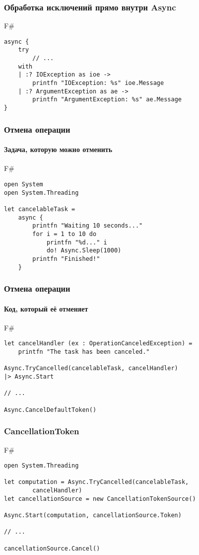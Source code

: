 \documentclass[xetex,mathserif,serif]{beamer}
\begin{document}
	\begin{frame}[fragile]
		\frametitle{Обработка исключений прямо внутри Async}
		\begin{exampleblock}{F\#}
			\begin{verbatim}
async {
    try
        // ...
    with
    | :? IOException as ioe ->
        printfn "IOException: %s" ioe.Message
    | :? ArgumentException as ae ->
        printfn "ArgumentException: %s" ae.Message
}
			\end{verbatim}
		\end{exampleblock}
\end{frame}

	\begin{frame}[fragile]
		\frametitle{Отмена операции}
		\framesubtitle{Задача, которую можно отменить}
		\begin{exampleblock}{F\#}
			\begin{verbatim}
open System
open System.Threading

let cancelableTask =
    async {
        printfn "Waiting 10 seconds..."
        for i = 1 to 10 do
            printfn "%d..." i
            do! Async.Sleep(1000)
        printfn "Finished!"
    }
			\end{verbatim}
		\end{exampleblock}
\end{frame}

	\begin{frame}[fragile]
		\frametitle{Отмена операции}
		\framesubtitle{Код, который её отменяет}
		\begin{exampleblock}{F\#}
			\begin{verbatim}
let cancelHandler (ex : OperationCanceledException) =
    printfn "The task has been canceled."

Async.TryCancelled(cancelableTask, cancelHandler)
|> Async.Start

// ...

Async.CancelDefaultToken()
			\end{verbatim}
		\end{exampleblock}
\end{frame}

	\begin{frame}[fragile]
		\frametitle{CancellationToken}
		\begin{exampleblock}{F\#}
			\begin{verbatim}
open System.Threading

let computation = Async.TryCancelled(cancelableTask, 
        cancelHandler)
let cancellationSource = new CancellationTokenSource()

Async.Start(computation, cancellationSource.Token)

// ...

cancellationSource.Cancel()
			\end{verbatim}
		\end{exampleblock}
\end{frame}
\end{document}
